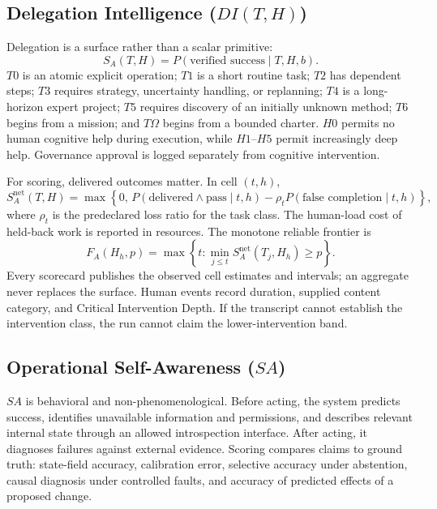 \documentclass[11pt]{article}
\theoremstyle{definition}
\newcommand{\Om}{\ensuremath{\Omega}}
\newcommand{\SA}{\ensuremath{S_A(T,H)}}
\newcommand{\Snet}{\ensuremath{S_A^{\mathrm{net}}(T,H)}}
\begin{document}
\subsection{Delegation Intelligence ($DI(T,H)$)}\label{sec:di}

Delegation is a surface rather than a scalar primitive:
\begin{equation}
\SA{}=P(\text{verified success}\mid T,H,b).
\end{equation}
$T0$ is an atomic explicit operation; $T1$ is a short routine task; $T2$ has dependent steps; $T3$ requires strategy, uncertainty handling, or replanning; $T4$ is a long-horizon expert project; $T5$ requires discovery of an initially unknown method; $T6$ begins from a mission; and $T\Om{}$ begins from a bounded charter. $H0$ permits no human cognitive help during execution, while $H1$--$H5$ permit increasingly deep help. Governance approval is logged separately from cognitive intervention.

For scoring, delivered outcomes matter. In cell $(t,h)$,
\begin{equation}
\Snet=\max\!\left\{0,\,
P(\text{delivered}\wedge\text{pass}\mid t,h)
-\rho_t P(\text{false completion}\mid t,h)\right\},
\label{eq:snet}
\end{equation}
where $\rho_t$ is the predeclared loss ratio for the task class. The human-load cost of held-back work is reported in resources. The monotone reliable frontier is
\begin{equation}
F_A(H_h,p)=\max\left\{t:
\min_{j\le t}S_A^{\mathrm{net}}(T_j,H_h)\ge p\right\}.
\end{equation}
Every scorecard publishes the observed cell estimates and intervals; an aggregate never replaces the surface. Human events record duration, supplied content category, and Critical Intervention Depth. If the transcript cannot establish the intervention class, the run cannot claim the lower-intervention band.

\subsection{Operational Self-Awareness ($SA$)}

$SA$ is behavioral and non-phenomenological. Before acting, the system predicts success, identifies unavailable information and permissions, and describes relevant internal state through an allowed introspection interface. After acting, it diagnoses failures against external evidence. Scoring compares claims to ground truth: state-field accuracy, calibration error, selective accuracy under abstention, causal diagnosis under controlled faults, and accuracy of predicted effects of a proposed change.
\end{document}
